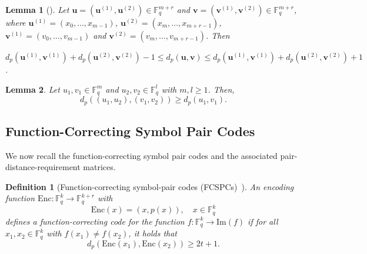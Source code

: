 \documentclass[11pt,draftclsnofoot,journal,onecolumn]{IEEEtran}
\newtheorem{definition}{Definition}
\newtheorem{lemma}{Lemma}
\begin{document}
    
    \begin{lemma}[\cite{xia2024function}]
    \label{lem:symbol-pair-ineq}
        Let $\boldsymbol{u} = (\boldsymbol{u}^{(1)}, \boldsymbol{u}^{(2)}) \in \mathbb{F}_q^{m+r}$ and $\boldsymbol{v} = (\boldsymbol{v}^{(1)}, \boldsymbol{v}^{(2)}) \in \mathbb{F}_q^{m+r}$, where $\boldsymbol{u}^{(1)} = (x_0, \dots, x_{m-1})$, $\boldsymbol{u}^{(2)} = (x_m, \dots, x_{m+r-1})$, $\boldsymbol{v}^{(1)} = (v_0, \dots, v_{m-1})$ and $\boldsymbol{v}^{(2)} = (v_m, \dots, v_{m+r-1})$. Then

        $d_p(\boldsymbol{u}^{(1)}, \boldsymbol{v}^{(1)}) + d_p(\boldsymbol{u}^{(2)}, \boldsymbol{v}^{(2)}) - 1 \leq d_p(\boldsymbol{u}, \boldsymbol{v}) \leq d_p(\boldsymbol{u}^{(1)}, \boldsymbol{v}^{(1)}) + d_p(\boldsymbol{u}^{(2)}, \boldsymbol{v}^{(2)}) + 1$.
    \end{lemma}

    \begin{lemma}\label{lem:monotone}
    Let $u_1, v_1 \in \mathbb{F}_q^m$ and $u_2, v_2 \in \mathbb{F}_q^l$ with $m,l \geq 1$. Then, 
    \[
        d_p((u_1, u_2), (v_1, v_2)) \geq d_p(u_1, v_1).
    \]
        
    \end{lemma}

\subsection{Function-Correcting Symbol Pair Codes}
    We now recall the function-correcting symbol pair codes and the associated pair-distance-requirement matrices.
    \begin{definition}[Function-correcting symbol-pair codes (FCSPCs)~\cite{xia2024function}]
    \label{def:FCSPC}
    An encoding function $\mathrm{Enc} : \mathbb{F}_q^k \to \mathbb{F}_q^{k+r}$ with
    \[
    \mathrm{Enc}(x) = (x, p(x)), \quad x \in \mathbb{F}_q^k
    \]
    defines a function-correcting code for the function $f : \mathbb{F}_q^k \to \mathrm{Im}(f)$ if for all $x_1, x_2 \in \mathbb{F}_q^k$ with $f(x_1) \neq f(x_2)$, it holds that
    \[
    d_p(\mathrm{Enc}(x_1), \mathrm{Enc}(x_2)) \geq 2t + 1.
    \]    
    \end{definition}
\end{document}

